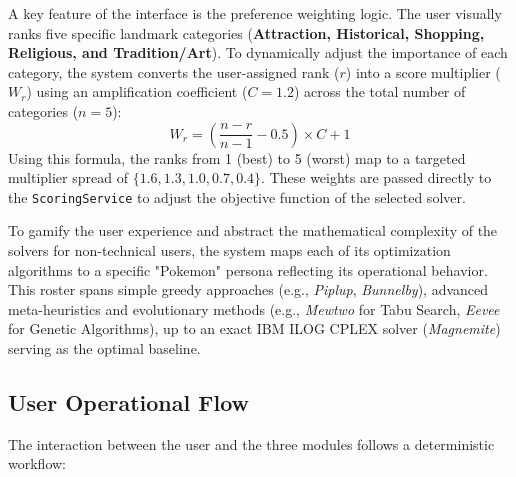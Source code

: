 A key feature of the interface is the preference weighting logic. The user visually ranks five specific landmark categories (\textbf{Attraction, Historical, Shopping, Religious, and Tradition/Art}). To dynamically adjust the importance of each category, the system converts the user-assigned rank ($r$) into a score multiplier ($W_r$) using an amplification coefficient ($C = 1.2$) across the total number of categories ($n = 5$):
\begin{equation}
    W_r = \left(\frac{n - r}{n - 1} - 0.5\right) \times C + 1
\end{equation}
Using this formula, the ranks from 1 (best) to 5 (worst) map to a targeted multiplier spread of $\mathbf{\{1.6, 1.3, 1.0, 0.7, 0.4\}}$. These weights are passed directly to the \texttt{ScoringService} to adjust the objective function of the selected solver.

To gamify the user experience and abstract the mathematical complexity of the solvers for non-technical users, the system maps each of its optimization algorithms to a specific "Pokemon" persona reflecting its operational behavior. This roster spans simple greedy approaches (e.g., \textit{Piplup}, \textit{Bunnelby}), advanced meta-heuristics and evolutionary methods (e.g., \textit{Mewtwo} for Tabu Search, \textit{Eevee} for Genetic Algorithms), up to an exact IBM ILOG CPLEX solver (\textit{Magnemite}) serving as the optimal baseline.


\subsection{User Operational Flow}
The interaction between the user and the three modules follows a deterministic workflow:

